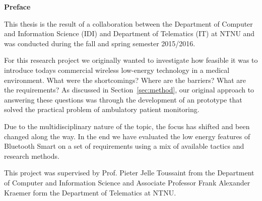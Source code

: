 	\noindent \textbf{Preface}
  \newline
  	
\noindent  
This thesis is the result of a collaboration between the Department of Computer and Information Science (IDI) and Department of Telematics (IT) at NTNU and was conducted during the fall and spring semester 2015/2016.

For this research project we originally wanted to investigate how feasible it was to introduce todays commercial wireless low-energy technology in a medical environment. What were the shortcomings? Where are the barriers? What are the requirements? As discussed in Section~\ref{sec:method}, our original approach to answering these questions was through the development of an prototype that solved the practical problem of ambulatory patient monitoring.

Due to the multidisciplinary nature of the topic, the focus has shifted and been changed along the way. In the end we have evaluated the low energy features of Bluetooth Smart on a set of requirements using a mix of available tactics and research methods.

This project was supervised by Prof. Pieter Jelle Toussaint from the Department of Computer and Information Science and Associate Professor Frank Alexander Kraemer form the Department of Telematics at NTNU.
